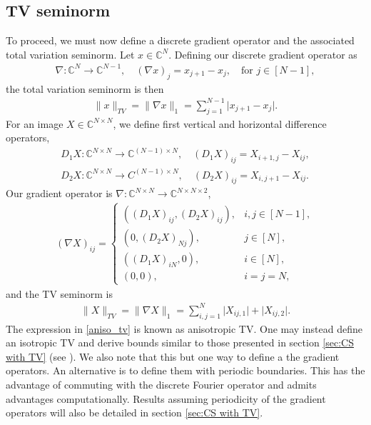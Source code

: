 \documentclass[11pt, oneside]{article}   %
\newcommand{\bC}{\mathbb{C}}
\newcommand{\norm}[1]{\lVert #1 \rVert}
\newcommand{\abs}[1]{\lvert#1 \rvert}
\begin{document}
\subsection{TV seminorm}
To proceed, we must now define a discrete gradient operator and the associated total 
variation seminorm. Let $x \in \bC^N$. Defining our discrete gradient 
operator as 
\begin{align*}
        \nabla: \bC^N \to \bC^{N-1}, \quad (\nabla x)_j =  x_{j+1} - x_j,
\quad\text{for } j \in [N-1], 
\end{align*}
the total variation seminorm is then 
\begin{align*}
        \norm{x}_{TV} = \norm{\nabla x}_1
= \sum^{N-1}_{j=1}\abs{x_{j+1} - x_j}.
\end{align*}
For an image $X \in \bC^{N\times N}$, we define first vertical and horizontal 
difference operators, 
\begin{align*}
        D_1X: \bC^{N\times N}\to \bC^{(N-1)\times N}, \quad 
(D_1X)_{ij} = X_{i+1, j} - X_{ij}, \\
D_2X: \bC^{N\times N} \to C^{(N-1)\times N}, \quad
(D_2X)_{ij} = X_{i,j+1} - X_{ij}.
\end{align*}
Our gradient operator is $\nabla: \bC^{N\times N}\to \bC^{N\times N\times 2}$,
\begin{align}
        (\nabla X)_{ij} 
= \begin{cases} 
          ((D_1X)_{ij}, (D_2X)_{ij}), & i,j \in [N-1],  \\
(0, (D_2X)_{Nj}), & j \in [N], \\
((D_1X)_{iN}, 0), & i \in [N], \\
(0, 0), & i = j = N,
  \end{cases}
\label{grad2d}
\end{align}
and the TV seminorm is 
\begin{align}
        \norm{X}_{TV} 
= \norm{\nabla X}_1 
= \sum^N_{i,j=1}\abs{X_{ij, 1}} + \abs{X_{ij, 2}}.
\label{aniso_tv}
\end{align}
The expression in \eqref{aniso_tv} is known as anisotropic TV. One may instead 
define an isotropic TV and derive bounds similar to those presented in section 
\ref{sec:CS with TV} (see \cite{needell2013near}). 
We also note that this but one way to define a the gradient operators. 
An alternative is to define them with periodic boundaries. This has the 
advantage of commuting with the discrete Fourier operator and admits advantages 
computationally. Results assuming periodicity of the gradient operators will 
also be detailed in section \ref{sec:CS with TV}.
\end{document}
